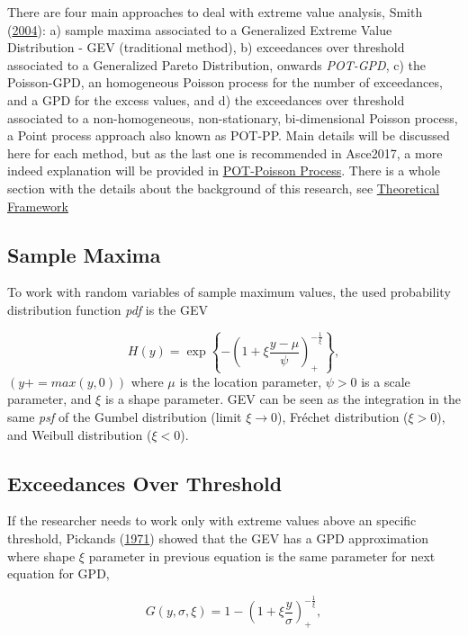 \documentclass[12pt,oneside]{reedthesis}
\begin{document}
There are four main approaches to deal with extreme value analysis, Smith (\protect\hyperlink{ref-Smith2004}{2004}): a) sample maxima associated to a Generalized Extreme Value Distribution - GEV (traditional method), b) exceedances over threshold associated to a Generalized Pareto Distribution, onwards \emph{POT-GPD}, c) the Poisson-GPD, an homogeneous Poisson process for the number of exceedances, and a GPD for the excess values, and
d) the exceedances over threshold associated to a non-homogeneous, non-stationary, bi-dimensional Poisson process, a Point process approach also known as POT-PP. Main details will be discussed here for each method, but as the last one is recommended in Asce2017, a more indeed explanation will be provided in \protect\hyperlink{pot-pp}{POT-Poisson Process}. There is a whole section with the details about the background of this research, see \protect\hyperlink{rmd-thefra}{Theoretical Framework}

\hypertarget{sample-maxima}{%
\subsection{Sample Maxima}\label{sample-maxima}}

To work with random variables of sample maximum values, the used probability distribution function \emph{pdf} is the GEV

\[
H(y) = \exp\left\{-\left(1+\xi\frac{y-\mu}{\psi}\right)_+^{-\frac{1}{\xi}}\right\},
\]
\((y+=max(y,0))\) where \(\mu\) is the location parameter, \(\psi > 0\) is a scale parameter, and \(\xi\) is a shape parameter. GEV can be seen as the integration in the same \emph{psf} of the Gumbel distribution (limit \(\xi\rightarrow0\)), Fréchet distribution (\(\xi>0\)), and Weibull distribution (\(\xi<0\)).

\hypertarget{exceedances-over-threshold}{%
\subsection{Exceedances Over Threshold}\label{exceedances-over-threshold}}

If the researcher needs to work only with extreme values above an specific threshold, Pickands (\protect\hyperlink{ref-Pickands1971}{1971}) showed that the GEV has a GPD approximation where shape \(\xi\) parameter in previous equation is the same parameter for next equation for GPD,

\[
G(y,\sigma, \xi) = 1-\left(1+\xi\frac{y}{\sigma}\right)_+^{-\frac{1}{\xi}},
\]
\end{document}
